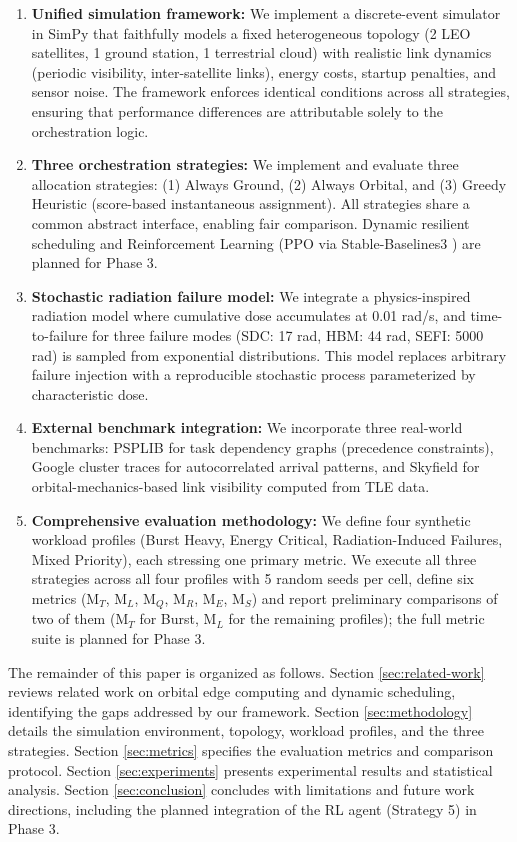 \documentclass[conference]{IEEEtran}
\begin{document}
\begin{enumerate}
    \item \textbf{Unified simulation framework:} We implement a discrete-event simulator in SimPy \cite{simpy} that faithfully models a fixed heterogeneous topology (2 LEO satellites, 1 ground station, 1 terrestrial cloud) with realistic link dynamics (periodic visibility, inter-satellite links), energy costs, startup penalties, and sensor noise. The framework enforces identical conditions across all strategies, ensuring that performance differences are attributable solely to the orchestration logic.
    \item \textbf{Three orchestration strategies:} We implement and evaluate three allocation strategies: (1) Always Ground, (2) Always Orbital, and (3) Greedy Heuristic (score-based instantaneous assignment). All strategies share a common abstract interface, enabling fair comparison. Dynamic resilient scheduling and Reinforcement Learning (PPO via Stable-Baselines3 \cite{stable-baselines3}) are planned for Phase 3.
    \item \textbf{Stochastic radiation failure model:} We integrate a physics-inspired radiation model where cumulative dose accumulates at 0.01 rad/s, and time-to-failure for three failure modes (SDC: 17 rad, HBM: 44 rad, SEFI: 5000 rad) is sampled from exponential distributions. This model replaces arbitrary failure injection with a reproducible stochastic process parameterized by characteristic dose.
    \item \textbf{External benchmark integration:} We incorporate three real-world benchmarks: PSPLIB \cite{psplib} for task dependency graphs (precedence constraints), Google cluster traces \cite{google-traces} for autocorrelated arrival patterns, and Skyfield \cite{skyfield} for orbital-mechanics-based link visibility computed from TLE data.
    \item \textbf{Comprehensive evaluation methodology:} We define four synthetic workload profiles (Burst Heavy, Energy Critical, Radiation-Induced Failures, Mixed Priority), each stressing one primary metric. We execute all three strategies across all four profiles with 5 random seeds per cell, define six metrics (M$_T$, M$_L$, M$_Q$, M$_R$, M$_E$, M$_S$) and report preliminary comparisons of two of them (M$_T$ for Burst, M$_L$ for the remaining profiles); the full metric suite is planned for Phase 3.
\end{enumerate}

The remainder of this paper is organized as follows. Section \ref{sec:related-work} reviews related work on orbital edge computing and dynamic scheduling, identifying the gaps addressed by our framework. Section \ref{sec:methodology} details the simulation environment, topology, workload profiles, and the three strategies. Section \ref{sec:metrics} specifies the evaluation metrics and comparison protocol. Section \ref{sec:experiments} presents experimental results and statistical analysis. Section \ref{sec:conclusion} concludes with limitations and future work directions, including the planned integration of the RL agent (Strategy 5) in Phase 3.
\end{document}
